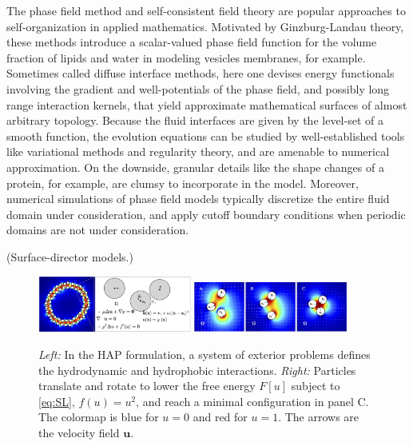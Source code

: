 The phase field method and self-consistent field theory are popular  
approaches to self-organization in applied mathematics.
Motivated by Ginzburg-Landau theory, these methods introduce a scalar-valued
phase field function for the volume fraction of
lipids and water in modeling vesicles membranes, for example. 
Sometimes called diffuse interface methods, here one devises energy functionals
involving the gradient and well-potentials of the phase field, and possibly
long range interaction kernels, that yield approximate mathematical surfaces
of almost arbitrary topology.
Because the fluid interfaces are given by the level-set
of a smooth function, the evolution equations
can be studied by well-established tools like variational methods
and regularity theory, and are amenable to numerical approximation.
On the downside, granular details like the shape changes of a protein, for
example, are clumsy to incorporate in the model.  Moreover, numerical
simulations of phase field models typically discretize the entire fluid
domain under consideration, and apply cutoff boundary conditions
when periodic domains are not under consideration. 

(Surface-director models.)

\begin{figure}
  \begin{center}
    \includegraphics[width=0.45\textwidth]{figures/SpecificAim1/Domain.jpg}
 \includegraphics[width=0.45\textwidth]{figures/SpecificAim1/3Particles.jpg}
  \end{center}
  \caption{\label{fig:flow_map} \footnotesize {\em Left:} In the HAP
  formulation, a system of exterior problems defines the hydrodynamic
  and hydrophobic interactions. {\em Right:} Particles translate and
  rotate to lower the free energy $F[u]$ subject to \eqref{eq:SL}, $f(u)
  = u^2$, and reach a minimal configuration in panel C. The colormap is
  blue for $u = 0$ and red for $u = 1$. The arrows are the velocity
  field $\mathbf{u}$.}
\end{figure}


